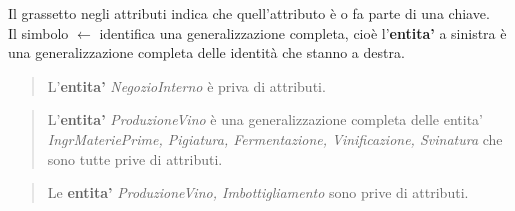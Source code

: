 Il grassetto negli attributi indica che quell'attributo è o fa parte di una chiave. \\
Il simbolo $\gets$ identifica una generalizzazione completa, cioè l'\textbf{entita'} a sinistra è una generalizzazione completa delle identità che stanno a destra.


\begin{verse}
	L'\textbf{entita'} \emph{NegozioInterno} è priva di attributi. 
\end{verse}

\begin{verse}
	L'\textbf{entita'} \emph{ProduzioneVino} è una generalizzazione completa delle entita' \emph{IngrMateriePrime, Pigiatura, Fermentazione, Vinificazione, Svinatura} che sono tutte prive di attributi.
\end{verse}
\begin{verse}
	Le \textbf{entita'} \emph{ProduzioneVino, Imbottigliamento} sono prive di attributi.
\end{verse}

